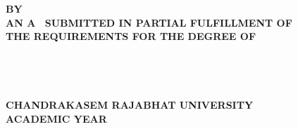 %
%
%
%
{\centering
	\fontsize{16}{18.4}\selectfont
	\bfseries\expandafter\uppercase\expandafter{\@thesistitle}\\\vspace{1.427465\baselineskip}\ \\
	\fontsize{14}{16.1}\selectfont\bfseries BY\\\vspace{1.427465\baselineskip}
	\expandafter\uppercase\expandafter{\@author}
	\vfill
	\ifx\@typeofwriting\IndStudy AN	\else A	\fi 
	\expandafter\uppercase\expandafter{\@typeofwriting}\ SUBMITTED IN PARTIAL FULFILLMENT OF\\
	THE REQUIREMENTS FOR THE DEGREE OF\\
	\expandafter\uppercase\expandafter{\@degree}\\
	\ifdefined\@major \expandafter\uppercase\expandafter{\@major}\\ \fi
	\ifdefined\@department \expandafter\uppercase\expandafter{\@department}\\ \fi
	\expandafter\uppercase\expandafter{\@faculty}\\
	CHANDRAKASEM RAJABHAT UNIVERSITY\\
	ACADEMIC YEAR \advance{} \the\year
	\par}

